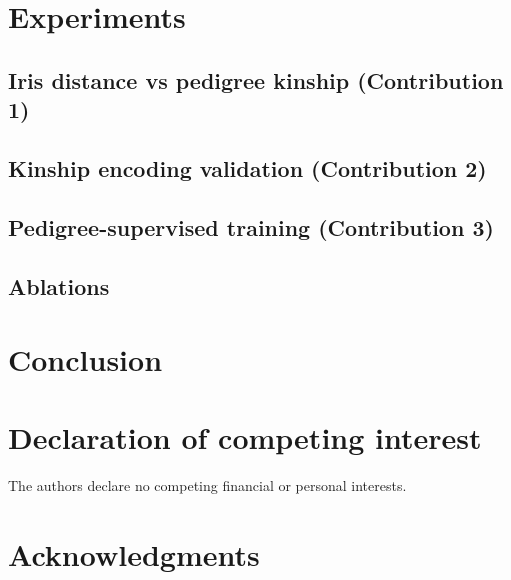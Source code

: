 \documentclass[review,3p]{elsarticle}
\begin{document}
\section{Experiments}
\label{sec:exp}
\subsection{Iris distance vs pedigree kinship (Contribution 1)}

\subsection{Kinship encoding validation (Contribution 2)}

\subsection{Pedigree-supervised training (Contribution 3)}

\subsection{Ablations}

\section{Conclusion}
\label{sec:conclusion}

\section*{Declaration of competing interest}
The authors declare no competing financial or personal interests.

\section*{Acknowledgments}



\end{document}
